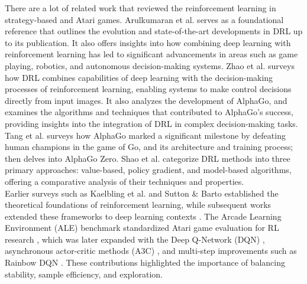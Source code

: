 
\renewcommand\theparagraph{\arabic{subsubsection}.\arabic{paragraph}}
\titleformat{\paragraph}[hang]{\normalfont\normalsize\bfseries}{\theparagraph}{1em}{}

There are a lot of related work that reviewed the
reinforcement learning in strategy-based and Atari games. 
Arulkumaran et al. \cite{I9} serves as a foundational reference that outlines 
the evolution and state-of-the-art developments in DRL up to its 
publication. It also offers insights into how combining deep learning 
with reinforcement learning has led to significant advancements in 
areas such as game playing, robotics, and autonomous decision-making 
systems. Zhao et al. \cite{I10} surveys how DRL combines 
capabilities of deep learning with the decision-making processes of 
reinforcement learning, enabling systems to make control decisions 
directly from input images. It also analyzes the development of 
AlphaGo, and examines the algorithms and techniques that contributed 
to AlphaGo’s success, providing insights into the integration of DRL 
in complex decision-making tasks. Tang et al. \cite{I11} surveys how 
AlphaGo marked a significant milestone by defeating human champions in 
the game of Go, and its architecture and training process; then delves 
into AlphaGo Zero. Shao et al. \cite{I12} categorize DRL methods into 
three primary approaches: value-based, policy gradient, and model-based 
algorithms, offering a comparative analysis of their techniques and 
properties.\\

Earlier surveys such as Kaelbling et al. \cite{kaelbling1996} and 
Sutton \& Barto \cite{suttonbarto2018} established the theoretical 
foundations of reinforcement learning, while subsequent works extended 
these frameworks to deep learning contexts \cite{dayan1992}\cite{williams1992}. 
The Arcade Learning Environment (ALE) benchmark standardized Atari game 
evaluation for RL research \cite{bellemare2013}, which was later expanded 
with the Deep Q-Network (DQN) \cite{mnih2015}, asynchronous actor-critic 
methods (A3C) \cite{I8}\cite{konda2000}, and multi-step improvements such as 
Rainbow DQN \cite{hessel2018}. These contributions highlighted the 
importance of balancing stability, sample efficiency, and exploration. \\

